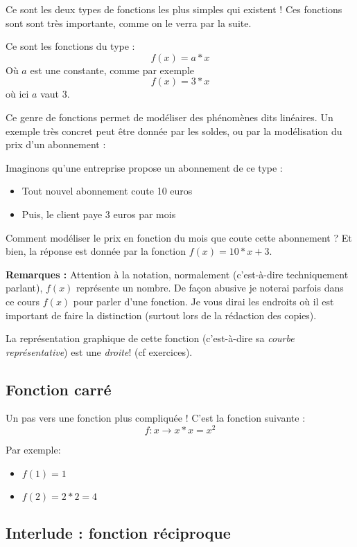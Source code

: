 \documentclass[french,]{article}
\providecommand{\tightlist}{%
  \setlength{\itemsep}{0pt}\setlength{\parskip}{0pt}}
\begin{document}
Ce sont les deux types de fonctions les plus simples qui existent ! Ces
fonctions sont sont très importante, comme on le verra par la suite.

Ce sont les fonctions du type : \[f(x) = a *x\] Où \(a\) est une
constante, comme par exemple \[f(x) = 3*x\] où ici \(a\) vaut \(3\).

Ce genre de fonctions permet de modéliser des phénomènes dits linéaires.
Un exemple très concret peut être donnée par les soldes, ou par la
modélisation du prix d'un abonnement :

Imaginons qu'une entreprise propose un abonnement de ce type :

\begin{itemize}
\tightlist
\item
  Tout nouvel abonnement coute 10 euros
\item
  Puis, le client paye 3 euros par mois
\end{itemize}

Comment modéliser le prix en fonction du mois que coute cette abonnement
? Et bien, la réponse est donnée par la fonction \(f(x) = 10*x + 3\).

\textbf{Remarques :} Attention à la notation, normalement (c'est-à-dire
techniquement parlant), \(f(x)\) représente un nombre. De façon abusive
je noterai parfois dans ce cours \(f(x)\) pour parler d'une fonction. Je
vous dirai les endroits où il est important de faire la distinction
(surtout lors de la rédaction des copies).

La représentation graphique de cette fonction (c'est-à-dire sa
\emph{courbe représentative}) est une \emph{droite}! (cf exercices).

\hypertarget{fonction-carruxe9}{%
\subsection{Fonction carré}\label{fonction-carruxe9}}

Un pas vers une fonction plus compliquée ! C'est la fonction suivante :
\[f : x \longrightarrow x *x = x^2\]

Par exemple:

\begin{itemize}
\tightlist
\item
  \(f(1) = 1\)
\item
  \(f(2) = 2*2 = 4\)
\end{itemize}

\hypertarget{interlude-fonction-ruxe9ciproque}{%
\subsection{Interlude : fonction
réciproque}\label{interlude-fonction-ruxe9ciproque}}
\end{document}
